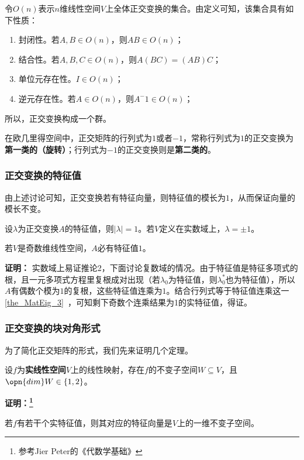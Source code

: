 令$O(n)$表示$n$维线性空间$V$上全体正交变换的集合。由定义可知，该集合具有如下性质：
\begin{enumerate}
\item 封闭性。若$A,B\in O(n)$，则$AB\in O(n)$；
\item 结合性。若$A,B,C\in O(n)$，则$A(BC)=(AB)C$；
\item 单位元存在性。$I\in O(n)$；
\item 逆元存在性。若$A\in O(n)$，则$A^-1\in O(n)$；
\end{enumerate}
所以，正交变换构成一个群。

在欧几里得空间中，正交矩阵的行列式为$1$或者$-1$，常称行列式为$1$的正交变换为\textbf{第一类的（旋转）}；行列式为$-1$的正交变换则是\textbf{第二类的}。
\subsubsection{正交变换的特征值}
由上述讨论可知，正交变换若有特征向量，则特征值的模长为$1$，从而保证向量的模长不变。
\begin{corollary}{}
 设$\lambda$为正交变换$A$的特征值，则$|\lambda|=1$。若$V$定义在实数域上，$\lambda=\pm 1$。
\end{corollary}
\begin{corollary}{}
若$V$是奇数维线性空间，$A$必有特征值$1$。
\end{corollary}
\textbf{证明：}
实数域上易证推论2，下面讨论复数域的情况。由于特征值是特征多项式的根，且一元多项式方程里复根成对出现（若$\lambda_0$为特征值，则$\lambda_0^{*}$也为特征值），所以$A$有偶数个模为$1$的复根，这些特征值连乘为$1$。结合行列式等于特征值连乘这一\autoref{the_MatEig_3}~，可知剩下奇数个连乘结果为1的实特征值，得证。
\subsubsection{正交变换的块对角形式}
为了简化正交矩阵的形式，我们先来证明几个定理。
\begin{theorem}{}
设$f$为\textbf{实线性空间}$V$上的线性映射，存在$f$的不变子空间$W\subseteq V$，且$\opn{dim}W\in\{1,2\}$。
\end{theorem}
\textbf{证明：\footnote{参考Jier Peter的《代数学基础》}}

若$f$有若干个实特征值，则其对应的特征向量是$V$上的一维不变子空间。

